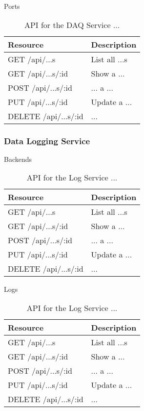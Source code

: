       \large{Ports}

      \begin{table}[H]
        \centering
        \begin{tabular}{p{6cm} p{10cm}}
          \toprule
          \textbf{Resource} & \textbf{Description} \\ [0.5ex]
          \midrule
          GET /api/...s & List all ...s \\
          GET /api/...s/:id & Show a ... \\
          POST /api/...s/:id & ... a ... \\
          PUT /api/...s/:id & Update a ... \\
          DELETE /api/...s/:id & ... \\
          \bottomrule
        \end{tabular}
        \caption{API for the DAQ Service ...}\label{tab:rest-daq-...}
      \end{table}

    \subsubsection{Data Logging Service}\label{sec:rest-log}

      \large{Backends}

      \begin{table}[H]
        \centering
        \begin{tabular}{p{6cm} p{10cm}}
          \toprule
          \textbf{Resource} & \textbf{Description} \\ [0.5ex]
          \midrule
          GET /api/...s & List all ...s \\
          GET /api/...s/:id & Show a ... \\
          POST /api/...s/:id & ... a ... \\
          PUT /api/...s/:id & Update a ... \\
          DELETE /api/...s/:id & ... \\
          \bottomrule
        \end{tabular}
        \caption{API for the Log Service ...}\label{tab:rest-log-...}
      \end{table}

      \large{Logs}

      \begin{table}[H]
        \centering
        \begin{tabular}{p{6cm} p{10cm}}
          \toprule
          \textbf{Resource} & \textbf{Description} \\ [0.5ex]
          \midrule
          GET /api/...s & List all ...s \\
          GET /api/...s/:id & Show a ... \\
          POST /api/...s/:id & ... a ... \\
          PUT /api/...s/:id & Update a ... \\
          DELETE /api/...s/:id & ... \\
          \bottomrule
        \end{tabular}
        \caption{API for the Log Service ...}\label{tab:rest-log-...}
      \end{table}

